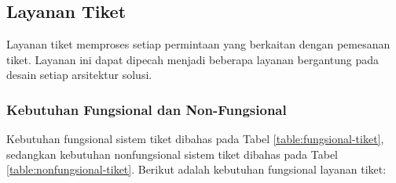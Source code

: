 \subsection{Layanan Tiket}

Layanan tiket memproses setiap permintaan yang berkaitan dengan pemesanan tiket. Layanan ini dapat dipecah menjadi beberapa layanan bergantung pada desain setiap arsitektur solusi.

\subsubsection{Kebutuhan Fungsional dan Non-Fungsional}

Kebutuhan fungsional sistem tiket dibahas pada Tabel \ref{table:fungsional-tiket}, sedangkan kebutuhan nonfungsional sistem tiket dibahas pada Tabel \ref{table:nonfungsional-tiket}. Berikut adalah kebutuhan fungsional layanan tiket:

